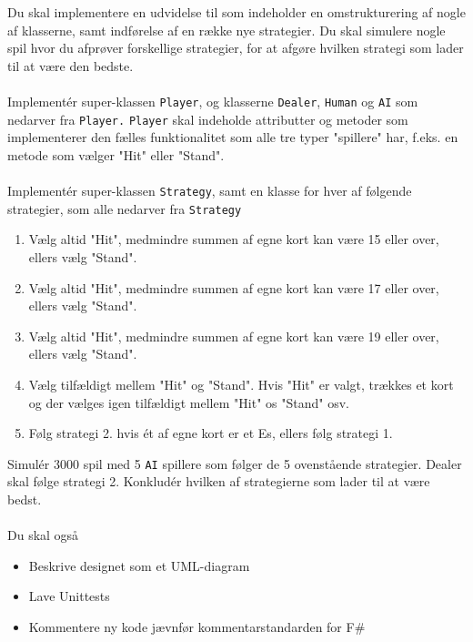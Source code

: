 Du skal implementere en udvidelse til \sbl som indeholder en omstrukturering af nogle af klasserne, samt indførelse af en række nye strategier. Du skal simulere nogle \sbl spil hvor du afprøver forskellige strategier, for at afgøre
  hvilken strategi som lader til at være den bedste. \\ \\
  Implement\'{e}r super-klassen \texttt{Player}, og klasserne \texttt{Dealer}, \texttt{Human} og \texttt{AI} som nedarver fra \texttt{Player.} \texttt{Player} skal indeholde attributter og metoder som implementerer den fælles funktionalitet
  som alle tre typer "spillere" har, f.eks. en metode som vælger "Hit" eller "Stand". \\ \\
  Implement\'{e}r super-klassen \texttt{Strategy}, samt en klasse for hver af følgende strategier, som alle nedarver fra \texttt{Strategy}
  \begin{enumerate}
  \item Vælg altid "Hit", medmindre summen af egne kort kan være 15 eller over, ellers vælg "Stand".
  \item Vælg altid "Hit", medmindre summen af egne kort kan være 17 eller over, ellers vælg "Stand".
  \item Vælg altid "Hit", medmindre summen af egne kort kan være 19 eller over, ellers vælg "Stand".
  \item Vælg tilfældigt mellem "Hit" og "Stand". Hvis "Hit" er valgt, trækkes et kort og der vælges igen tilfældigt mellem
    "Hit" os "Stand" osv.
  \item Følg strategi 2. hvis \'{e}t af egne kort er et Es, ellers følg strategi 1.
  \end{enumerate}
  Simul\'{e}r 3000 spil \sbl med 5 \texttt{AI} spillere som følger de 5 ovenstående strategier.
  Dealer skal følge strategi 2. 
  Konklud\'{e}r hvilken af strategierne som lader til at være bedst. \\ \\
  Du skal også
  \begin{itemize}
  \item Beskrive designet som et UML-diagram
  \item Lave Unittests
  \item Kommentere ny kode jævnfør kommentarstandarden for F\#
  \end{itemize}
